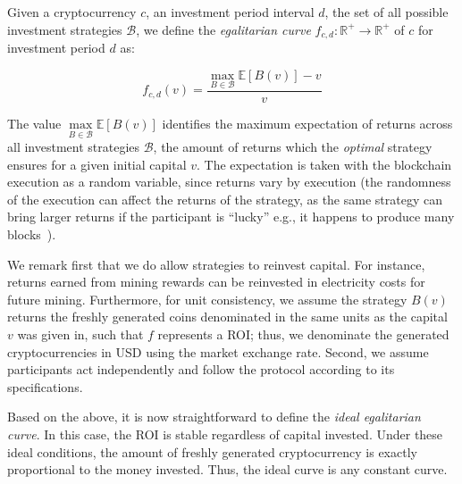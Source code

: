 \begin{definition}
    Given a cryptocurrency $c$, an investment period interval $d$, the set of
    all possible investment strategies $\mathcal{B}$, we define the \emph{egalitarian curve}
    $f_{c,d}: \mathbb{R}^+ \longrightarrow \mathbb{R}^+$ of $c$ for
    investment period $d$ as:

    \[
        f_{c,d}(v) = \frac{\underset{B \in \mathcal{B}}{\max}{\mathbb{E}[B(v)]} - v}{v}
    \]
\end{definition}

The value $\underset{B \in \mathcal{B}}{\max}{\mathbb{E}[B(v)]}$ identifies the maximum expectation of
returns across all investment strategies $\mathcal{B}$, \ie the amount of
returns which the \emph{optimal} strategy ensures for a given initial capital $v$.
The expectation is taken with the blockchain execution as a random variable,
since returns vary by execution (the randomness of the execution can affect the
returns of the strategy, as the same strategy can bring larger returns if the
participant is ``lucky'' e.g., it happens to produce many blocks~\cite{equitability}).

We remark first that we do allow strategies to reinvest capital. For instance,
returns earned from mining rewards can be reinvested in electricity costs for
future mining. Furthermore, for unit consistency, we assume the strategy
$B(v)$ returns the freshly generated coins denominated in the same units as the capital $v$ was given in, such that $f$ represents a ROI; thus, we denominate the
generated cryptocurrencies in USD using the market exchange rate.
Second, we assume participants act independently and follow the protocol
according to its specifications. 

Based on the above, it
is now straightforward to define the \emph{ideal egalitarian curve}. In this
case, the ROI is stable regardless of capital invested. Under these ideal
conditions, the amount of freshly generated cryptocurrency is exactly
proportional to the money invested. Thus, the ideal curve is any constant
curve.

%

